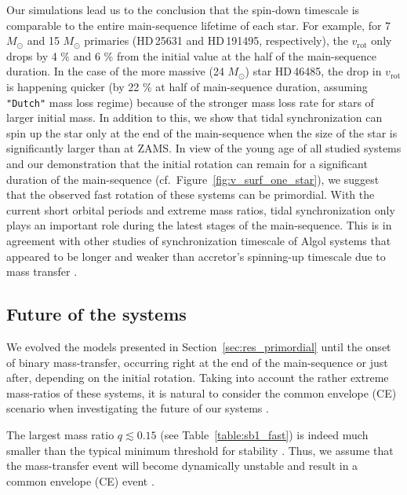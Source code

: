 \documentclass{aa}
\DeclareRobustCommand{\Figref}[1]{Figure~\ref{#1}}
\DeclareRobustCommand{\Tabref}[1]{Table~\ref{#1}}
\DeclareRobustCommand{\Secref}[1]{Section~\ref{#1}}
\begin{document}
Our simulations lead us to the conclusion that the spin-down timescale is comparable to the entire main-sequence lifetime of each star.
For example, for 7 $M_{\odot}$ and 15 $M_{\odot}$ primaries (HD\,25631 and HD\,191495, respectively), the $v_\mathrm{rot}$ only drops by 4 $\%$ and 6 $\%$ from the initial value at the half of the main-sequence duration.
In the case of the more massive (24 $M_{\odot}$) star HD\,46485, the
drop in $v_\mathrm{rot}$ is happening quicker (by 22 $\%$ at half of main-sequence duration, assuming \texttt{"Dutch"} mass loss regime) because of the
stronger mass loss rate for stars of larger initial mass.
In addition to this, we show that tidal synchronization can spin up the star only at the end of the main-sequence when the size of the star is significantly larger than at ZAMS.
In view of the young age of all studied systems \citep[$<$ 10 Myrs,
see \Tabref{table:sb1_fast} and][]{Naze_2023_rot} and our
demonstration that the initial rotation can remain for a significant
duration of the main-sequence (cf.~\Figref{fig:v_surf_one_star}), we suggest that the observed fast rotation
of these systems can be primordial.
With the current short orbital periods and extreme mass ratios, tidal
synchronization only plays an important role during the latest stages
of the main-sequence.
This is in agreement with other studies of synchronization timescale of Algol systems that appeared to be longer and weaker than accretor's spinning-up timescale due to mass transfer \citep[see, e.g.][]{Deschamps_2013}.



\subsection{Future of the systems}

We evolved the models presented in \Secref{sec:res_primordial}
  until the onset of binary mass-transfer, occurring right at the end
  of the main-sequence or just after, depending on the initial
  rotation. Taking into account the rather extreme mass-ratios of these systems, it is natural to consider
the common envelope (CE) scenario when investigating the future of our
systems \citep{paczynski:1976,claeys:14,renzo:21gwce}.

The largest mass ratio $q\lesssim0.15$ (see \Tabref{table:sb1_fast})
  is indeed much smaller than the  typical minimum threshold for stability \citep[e.g.,
  $q\geq q_\mathrm{crit}\simeq0.25-0.625$ for main-sequence
  interactions,][]{claeys:14}. Thus, we assume that the mass-transfer
  event will become dynamically unstable and result in a common
  envelope (CE) event \citep{paczynski:1976, ivanova:2013, ivanova:2020,
    renzo:21gwce}.
\end{document}
